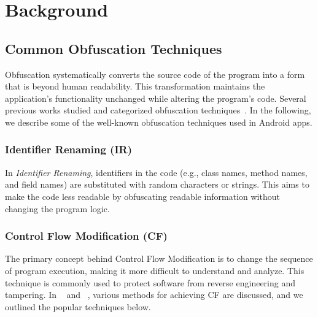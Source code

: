 \section{Background}
\label{sec:Obfuscation Intro}

\subsection{Common Obfuscation Techniques}
\label{sec:obfustexchniques}

Obfuscation systematically converts the source code of the program into a form that is beyond human readability. This transformation maintains the application's functionality unchanged while altering the program's code. Several previous works studied and categorized obfuscation techniques~\cite{zhang2021android,conti2022obfuscation,guo2022survey,dong2018understanding,wermke2018large}. In the following, we describe some of the well-known obfuscation techniques used in Android apps.

\subsubsection{Identifier Renaming (IR)}

In \textit{Identifier Renaming}, identifiers in the code (e.g., class names, method names, and field names) are substituted with random characters or strings. This aims to make the code less readable by obfuscating readable information without changing the program logic. 

\subsubsection{Control Flow Modification (CF)}
The primary concept behind Control Flow Modification is to change the sequence of program execution, making it more difficult to understand and analyze. This technique is commonly used to protect software from reverse engineering and tampering. In ~\cite{guo2022survey} and ~\cite{zhang2021android}, various methods for achieving CF are discussed, and we outlined the popular techniques below.

